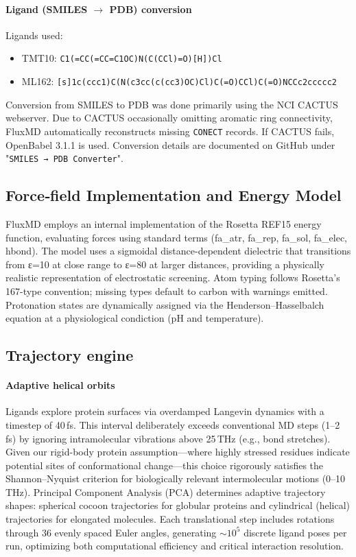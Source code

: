 \documentclass[pdflatex,sn-mathphys-num]{sn-jnl}
\begin{document}
\paragraph{Ligand (SMILES $\rightarrow$ PDB) conversion}
Ligands used:
{\small
\begin{itemize}
    \item TMT10: \texttt{C1(=CC(=CC=C1OC)N(C(CCl)=O)[H])Cl}
    \item ML162: \texttt{[s]1c(ccc1)C(N(c3cc(c(cc3)OC)Cl)C(=O)CCl)C(=O)NCCc2ccccc2}
\end{itemize}
}
Conversion from SMILES to PDB was done primarily using the NCI CACTUS webserver. Due to CACTUS occasionally omitting aromatic ring connectivity, FluxMD automatically reconstructs missing \texttt{CONECT} records. If CACTUS fails, OpenBabel 3.1.1 is used. Conversion details are documented on GitHub under "\texttt{SMILES → PDB Converter}".

\subsection*{Force‑field Implementation and Energy Model}
FluxMD employs an internal implementation of the Rosetta REF15 energy function, evaluating forces using standard terms (fa_atr, fa_rep, fa_sol, fa_elec, hbond). The model uses a sigmoidal distance-dependent dielectric that transitions from ε=10 at close range to ε=80 at larger distances, providing a physically realistic representation of electrostatic screening. Atom typing follows Rosetta's 167-type convention; missing types default to carbon with warnings emitted. Protonation states are dynamically assigned via the Henderson–Hasselbalch equation at a physiological condiction (pH and temperature).

\subsection*{Trajectory engine}

\paragraph{Adaptive helical orbits}
Ligands explore protein surfaces via overdamped Langevin dynamics with a timestep of 40\,fs. This interval deliberately exceeds conventional MD steps (1–2\,fs) by ignoring intramolecular vibrations above 25\,THz (e.g., bond stretches). Given our rigid-body protein assumption—where highly stressed residues indicate potential sites of conformational change—this choice rigorously satisfies the Shannon–Nyquist criterion for biologically relevant intermolecular motions (0–10\,THz). Principal Component Analysis (PCA) determines adaptive trajectory shapes: spherical cocoon trajectories for globular proteins and cylindrical (helical) trajectories for elongated molecules. Each translational step includes rotations through 36 evenly spaced Euler angles, generating $\sim 10^5$ discrete ligand poses per run, optimizing both computational efficiency and critical interaction resolution.
\end{document}
